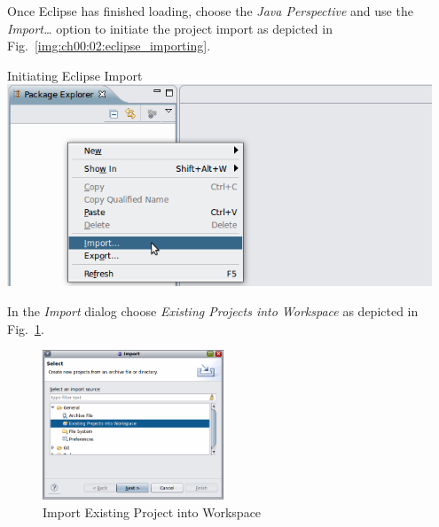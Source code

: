   Once Eclipse has finished loading, choose the \emph{Java Perspective} and use the \emph{Import\ldots} option to initiate the project import as depicted in Fig.~\ref{img:ch00:02:eclipse_importing}.
  
  \begin{image}{Initiating Eclipse Import}{\label{img:ch00:02:eclipse_importing}}    
    \includegraphics[width=0.95\textwidth]{parts/00-part/chapters/01-application-modules/images/08-eclipse-importing.png}
  \end{image}

  In the \emph{Import} dialog choose \emph{Existing Projects into Workspace} as depicted in Fig.~\ref{img:ch00:02:eclipse_importing_existing}.

  \begin{figure}
    \capstart  
    \captionsetup{font=footnotesize,justification=centering,labelsep=colon,labelfont=bf,singlelinecheck=false,indention=0pt,position=below}  
    \vspace*{-20pt} 
    \caption{\label{img:ch00:02:eclipse_importing_existing}Import Existing Project into Workspace}
    \begin{center}
      \includegraphics[width=0.48\textwidth]{parts/00-part/chapters/01-application-modules/images/09-eclipse-importing.png}
    \end{center}
     \vspace*{-10pt} 
  \end{figure}


